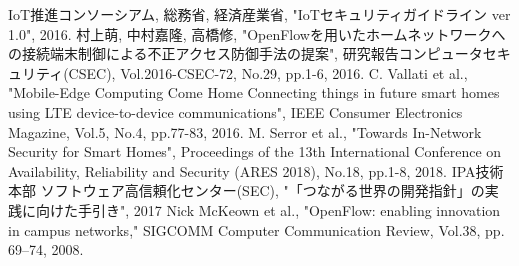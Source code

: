 \documentclass[a4paper,10pt,twocolumn,uplatex]{jsarticle}
\begin{document}
\footnotesize{
  \begin{thebibliography}{99}
     IoT推進コンソーシアム, 総務省, 経済産業省, "IoTセキュリティガイドライン ver 1.0", 2016.
     村上萌, 中村嘉隆, 高橋修, "OpenFlowを用いたホームネットワークへの接続端末制御による不正アクセス防御手法の提案", 研究報告コンピュータセキュリティ(CSEC), Vol.2016-CSEC-72, No.29, pp.1-6, 2016.
     C. Vallati et al., "Mobile-Edge Computing Come Home Connecting things in future smart homes using LTE device-to-device communications", IEEE Consumer Electronics Magazine, Vol.5, No.4, pp.77-83, 2016.
     M. Serror et al., "Towards In-Network Security for Smart Homes", Proceedings of the 13th International Conference on Availability, Reliability and Security (ARES 2018), No.18, pp.1-8, 2018.
     IPA技術本部 ソフトウェア高信頼化センター(SEC), "「つながる世界の開発指針」の実践に向けた手引き", 2017
     Nick McKeown et al., "OpenFlow: enabling innovation in campus networks," SIGCOMM Computer Communication Review, Vol.38, pp. 69–74, 2008.
  \end{thebibliography}
}

\end{document}
